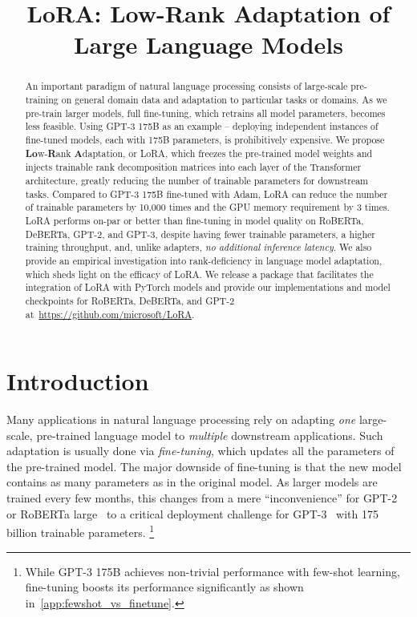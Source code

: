 \title{LoRA: Low-Rank Adaptation of Large Language Models}

\begin{abstract}
An important paradigm of natural language processing consists of large-scale pre-training on general domain data and adaptation to particular tasks or domains. As we pre-train larger models, full fine-tuning, which retrains all model parameters, becomes less feasible. Using GPT-3 175B as an example -- deploying independent instances of fine-tuned models, each with 175B parameters, is prohibitively expensive. We propose \textbf{Lo}w-\textbf{R}ank \textbf{A}daptation, or LoRA, which freezes the pre-trained model weights and injects trainable rank decomposition matrices into each layer of the Transformer architecture, greatly reducing the number of trainable parameters for downstream tasks. Compared to GPT-3 175B fine-tuned with Adam, LoRA can reduce the number of trainable parameters by 10,000 times and the GPU memory requirement by 3 times. LoRA performs on-par or better than fine-tuning in model quality on RoBERTa, DeBERTa, GPT-2, and GPT-3, despite having fewer trainable parameters, a higher training throughput, and, unlike adapters, \textit{no additional inference latency}. We also provide an empirical investigation into rank-deficiency in language model adaptation, which sheds light on the efficacy of LoRA. We release a package that facilitates the integration of LoRA with PyTorch models and provide our implementations and model checkpoints for RoBERTa, DeBERTa, and GPT-2 at~\url{https://github.com/microsoft/LoRA}.
\end{abstract}

\section{Introduction}

Many applications in natural language processing rely on adapting \emph{one} large-scale, pre-trained language model to \emph{multiple} downstream applications. Such adaptation is usually done via \emph{fine-tuning}, which updates all the parameters of the pre-trained model. The major downside of fine-tuning is that the new model contains as many parameters as in the original model. As larger models are trained every few months, this changes from a mere ``inconvenience'' for GPT-2~\citep{radford_language_nodate} or RoBERTa large~\citep{liu2019roberta} to a critical deployment challenge for GPT-3~\citep{brown_language_2020} with 175 billion trainable parameters.
\footnote{While GPT-3 175B achieves non-trivial performance with few-shot learning, fine-tuning boosts its performance significantly as shown in~\autoref{app:fewshot_vs_finetune}.}

